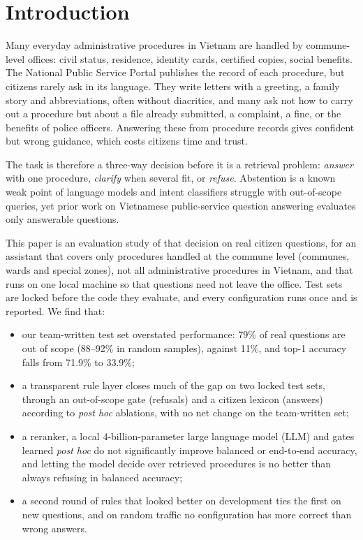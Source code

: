 \section{Introduction}

Many everyday administrative procedures in Vietnam are handled by commune-level offices: civil status, residence, identity cards,
certified copies, social benefits. The National Public Service Portal publishes the record of each procedure\cite{dvcportal}, but citizens
rarely ask in its language. They write letters with a greeting, a family story and abbreviations, often without diacritics, and many ask
not how to carry out a procedure but about a file already submitted, a complaint, a fine, or the benefits of police officers. Answering
these from procedure records gives confident but wrong guidance, which costs citizens time and trust\cite{kaplan2026,samson2026}.

The task is therefore a three-way decision before it is a retrieval problem: \emph{answer} with one procedure, \emph{clarify} when several
fit, or \emph{refuse}. Abstention is a known weak point of language models\cite{wen2025,kamath2020} and intent classifiers struggle with
out-of-scope queries\cite{larson2019}, yet prior work on Vietnamese public-service question answering evaluates only answerable
questions\cite{phamduy2023}.

This paper is an evaluation study of that decision on real citizen questions, for an assistant that covers only procedures handled at the
commune level (communes, wards and special zones), not all administrative procedures in Vietnam, and that runs on one local machine so that
questions need not leave the office\cite{jimenez2026}. Test sets are locked before the code they evaluate, and every
configuration runs once and is reported. We find that:
\begin{itemize}
\item our team-written test set overstated performance: 79\% of real questions are out of scope (88--92\% in random samples), against
11\%, and top-1 accuracy falls from 71.9\% to 33.9\%;
\item a transparent rule layer closes much of the gap on two locked test sets, through an out-of-scope gate (refusals) and a citizen
lexicon (answers) according to \emph{post hoc} ablations, with no net change on the team-written set;
\item a reranker, a local 4-billion-parameter large language model (LLM) and gates learned \emph{post hoc} do not significantly
improve balanced or end-to-end accuracy, and letting
the model decide over retrieved procedures is no better than always refusing in balanced accuracy;
\item a second round of rules that looked better on development ties the first on new questions, and on random traffic no
configuration has more correct than wrong answers.
\end{itemize}
